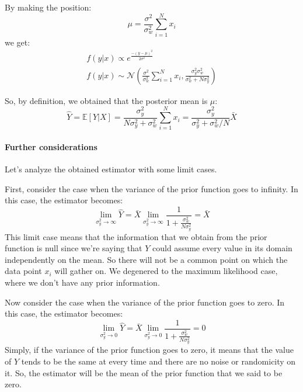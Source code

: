 By making the position:
\[
    \mu = \frac{\sigma^2}{\sigma_w^2}\sum_{i=1}^{N} x_i
\]
we get:
\begin{gather*}
    f(y|x) \propto e^{\frac{-(y-\mu)^2}{2\sigma^2}} \\
    f(y|x) \sim \mathcal N \left(\frac{\sigma^2}{\sigma_w^2}\sum_{i=1}^{N} x_i,  \frac{\sigma^2_y\sigma^2_w}{\sigma^2_w+N\sigma^2_y}\right)
\end{gather*}

So, by definition, we obtained that the posterior mean is $\mu$:
\[
    \hat{Y} = \mathbb{E}\left[ Y | X\right] = \frac{\sigma_y^2}{N\sigma_y^2 + \sigma_w^2} \sum_{i=1}^{N} x_i = \frac{\sigma_y^2}{\sigma_y^2 + \sigma_w^2/N} \bar X 
\]

\paragraph*{Further considerations}
Let's analyze the obtained estimator with some limit cases.

First, consider the case when the variance of the prior function goes to infinity. In this case, the estimator becomes:
\[
    \lim_{\sigma^2_y\to\infty} \hat Y = \bar X   \lim_{\sigma^2_y\to\infty} \frac 1{1+\frac{\sigma^2_w}{N\sigma^2_y}} = \bar X
\]
This limit case means that the information that we obtain from the prior function is null since we're saying that $Y$ could assume every value in its domain independently on the mean. So there will not be a common point on which the data point $x_i$ will gather on.
We degenered to the maximum likelihood case, where we don't have any prior information.

Now consider the case when the variance of the prior function goes to zero. In this case, the estimator becomes:
\[
    \lim_{\sigma^2_y\to0} \hat Y = \bar X \lim_{\sigma^2_y\to 0}\frac{1}{1+\frac{\sigma^2_w}{N\sigma^2_y}} = 0
\]
Simply, if the variance of the prior function goes to zero, it means that the value of $Y$ tends to be the same at every time and there are no noise or randomicity on it. So, the estimator will be the mean of the prior function that we said to be zero. %

